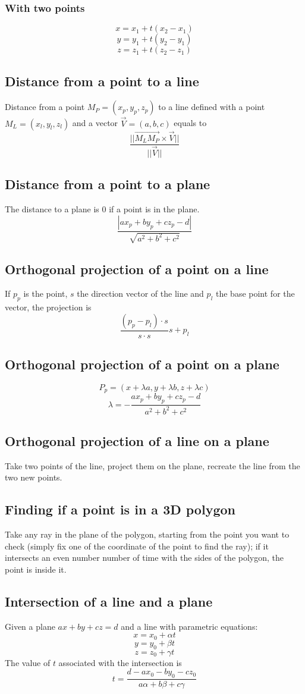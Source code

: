 \subsubsection{With two points}
$$x=x_1+t(x_2-x_1)$$
$$y=y_1+t(y_2-y_1)$$
$$z=z_1+t(z_2-z_1)$$
\subsection{Distance from a point to a line}
Distance from a point $M_P=(x_p, y_p, z_p)$ to a line defined with a point $M_L=(x_l, y_l, z_l)$ and a vector $\vec{V}=(a, b, c)$ equals to
$$\frac{||\vec{M_LM_P}\times\vec{V}||}{||\vec{V}||}$$
\subsection{Distance from a point to a plane}
The distance to a plane is 0 if a point is in the plane.
$$\frac{|ax_p+by_p+cz_p-d|}{\sqrt{a^2+b^2+c^2}}$$
\subsection{Orthogonal projection of a point on a line}
If $p_p$ is the point, $s$ the direction vector of the line and $p_l$ the base point for the vector, the projection is
$$\frac{(p_p-p_l)\cdot s}{s\cdot s}s+p_l$$
\subsection{Orthogonal projection of a point on a plane}
$$P_p=(x+\lambda a, y+\lambda b, z + \lambda c)$$
$$\lambda = -\frac{ax_p+by_p+cz_p-d}{a^2+b^2+c^2}$$
\subsection{Orthogonal projection of a line on a plane}
Take two points of the line, project them on the plane, recreate the line from the two new points.
\subsection{Finding if a point is in a 3D polygon}
Take any ray in the plane of the polygon, starting from the point you want to check (simply fix one of the coordinate of the point to find the ray); if it intersects an even number number of time with the sides of the polygon, the point is inside it.
\subsection{Intersection of a line and a plane}
Given a plane $ax+by+cz=d$ and a line with parametric equations:
$$x=x_0+\alpha t$$
$$y=y_0+\beta t$$
$$z=z_0+\gamma t$$
The value of $t$ associated with the intersection is
$$t=\frac{d-ax_0-by_0-cz_0}{a\alpha+b\beta+c\gamma}$$
